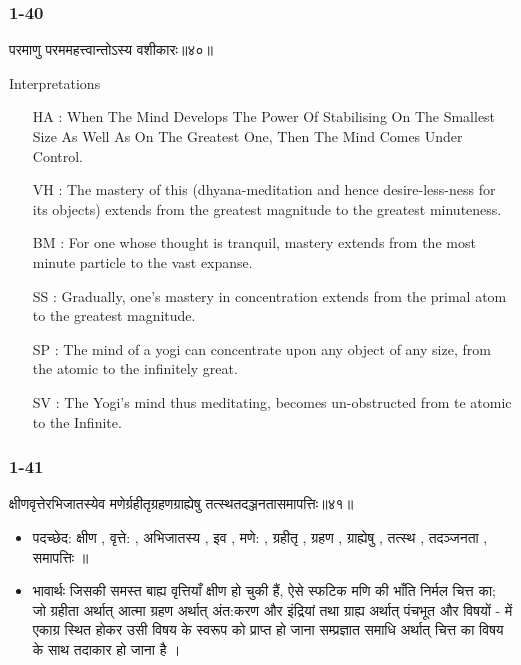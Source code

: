 \begin{frame}[fragile]\frametitle{1-40}
\begin{sanskrit}
परमाणु परममहत्त्वान्तोऽस्य वशीकारः॥४०॥
\end{sanskrit}

Interpretations
\begin{itemize}	
\item [HA]: When The Mind Develops The Power Of Stabilising On The Smallest Size As Well As On The Greatest One, Then The Mind Comes Under Control.
\item [VH]: The mastery of this (dhyana-meditation and hence desire-less-ness for its objects) extends from the greatest magnitude to the greatest minuteness.
\item [BM]: For one whose thought is tranquil, mastery extends from the most minute particle to the vast expanse.
\item [SS]: Gradually, one’s mastery in concentration extends from the primal atom to the greatest magnitude.
\item [SP]: The mind of a yogi can concentrate upon any object of any size, from the atomic to the infinitely great.
\item [SV]: The Yogi’s mind thus meditating, becomes un-obstructed from te atomic to the Infinite. 
\end{itemize}
	
\end{frame}

\begin{frame}[fragile]\frametitle{1-41}
\begin{sanskrit}
क्षीणवृत्तेरभिजातस्येव मणेर्ग्रहीतृग्रहणग्राह्येषु तत्स्थतदञ्जनतासमापत्तिः॥४१॥
\end{sanskrit}

\begin{itemize}
\item पदच्छेद: क्षीण , वृत्ते: , अभिजातस्य , इव , मणे: , ग्रहीतृ , ग्रहण , ग्राह्येषु , तत्स्थ , तदञ्जनता , समापत्तिः ॥
\item भावार्थः जिसकी समस्त बाह्य वृत्तियाँ क्षीण हो चुकी हैं, ऐसे स्फटिक मणि की भाँति निर्मल चित्त का; जो ग्रहीता अर्थात् आत्मा ग्रहण अर्थात् अंत:करण और इंद्रियां तथा ग्राह्य अर्थात् पंचभूत और विषयों - में एकाग्र स्थित होकर उसी विषय के स्वरूप को प्राप्त हो जाना सम्प्रज्ञात समाधि अर्थात् चित्त का विषय के साथ तदाकार हो जाना है ।		
\end{itemize}
	
\end{frame}

